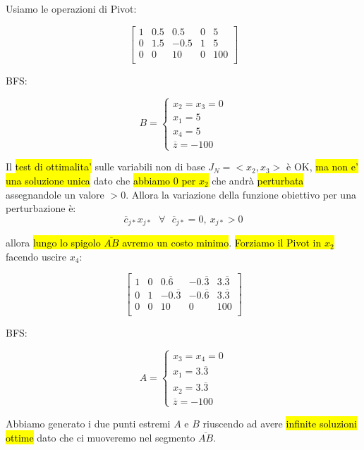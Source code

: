 Usiamo le operazioni di Pivot:

$$
\left[ {\begin{array}{ccccc}
	1 & 0.5 & 0.5 & 0 & 5\\
	0 & 1.5 & -0.5 & 1 & 5\\
	0 & 0 & 10 & 0 & 100\\
\end{array} } \right]
$$

BFS:

$$B =
\begin{cases} 
    x_2 = x_3 = 0 \\ 
    x_1 = 5 \\
	x_4 = 5 \\
	\overline{z} = -100
\end{cases}
$$

Il \hl{test di ottimalita'} sulle variabili non di base $J_N = <x_2, x_3>$ è OK, \hl{ma non e' una soluzione unica} dato che \hl{abbiamo $0$ per $x_2$} che andrà \hl{perturbata} assegnandole un valore $> 0$. Allora la variazione della funzione obiettivo per una perturbazione è:
$$\overline{c}_{j*}x_{j*}\ \ \ \forall\ \ \ \overline{c}_{j*}=0,\ x_{j*} > 0$$

allora \hl{lungo lo spigolo $\overline{AB}$ avremo un costo minimo}. \hl{Forziamo il Pivot in $x_2$} facendo uscire $x_4$:

$$
\left[ {\begin{array}{ccccc}
	1 & 0 & 0.\overline{6} & -0.\overline{3} & 3.\overline{3}\\
	0 & 1 & -0.\overline{3} & -0.\overline{6} & 3.\overline{3}\\
	0 & 0 & 10 & 0 & 100\\
\end{array} } \right]
$$

BFS:


$$A =
\begin{cases} 
    x_3 = x_4 = 0 \\ 
    x_1 = 3.\overline{3} \\
	x_2 = 3.\overline{3} \\
	\overline{z} = -100
\end{cases}
$$

Abbiamo generato i due punti estremi $A$ e $B$ riuscendo ad avere \hl{infinite soluzioni ottime} dato che ci muoveremo nel segmento $\overline{AB}$.